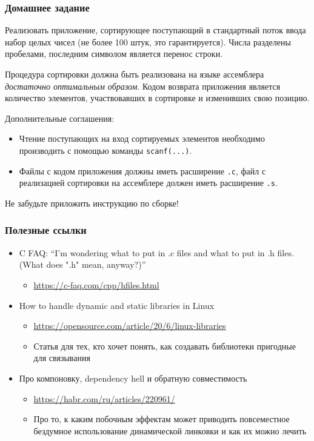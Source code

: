 \documentclass[aspectratio=169]{beamer}
\begin{document}
\begin{frame}
    \frametitle{Домашнее задание}

    Реализовать приложение, сортирующее поступающий в стандартный поток ввода набор целых чисел (не более 100 штук, это гарантируется).
    Числа разделены пробелами, последним символом является перенос строки.

    Процедура сортировки должна быть реализована на языке ассемблера \textit{достаточно оптимальным образом}.
    Кодом возврата приложения является количество элементов, участвовавших в сортировке и изменивших свою позицию.

    Дополнительные соглашения:
    \begin{itemize}
        \item Чтение поступающих на вход сортируемых элементов необходимо производить с помощью команды \texttt{scanf(...)}.
        \item Файлы с кодом приложения должны иметь расширение \texttt{.c}, файл с реализацией сортировки на ассемблере должен иметь расширение \texttt{.s}.
    \end{itemize}

    \alert{Не забудьте приложить инструкцию по сборке!}

\end{frame}

\begin{frame}
    \frametitle{Полезные ссылки}

    \begin{itemize}
        \item C FAQ: \enquote{I'm wondering what to put in .c files and what to put in .h files. (What does ".h" mean, anyway?)}
              \begin{itemize}
                  \item \url{https://c-faq.com/cpp/hfiles.html}
              \end{itemize}
        \item How to handle dynamic and static libraries in Linux
              \begin{itemize}
                  \item \url{https://opensource.com/article/20/6/linux-libraries}
                  \item Статья для тех, кто хочет понять, как создавать библиотеки пригодные для связывания
              \end{itemize}
        \item Про компоновку, dependency hell и обратную совместимость
              \begin{itemize}
                  \item \url{https://habr.com/ru/articles/220961/}
                  \item Про то, к каким побочным эффектам может приводить повсеместное бездумное использование динамической линковки и как их можно лечить
              \end{itemize}
    \end{itemize}

\end{frame}
\end{document}
